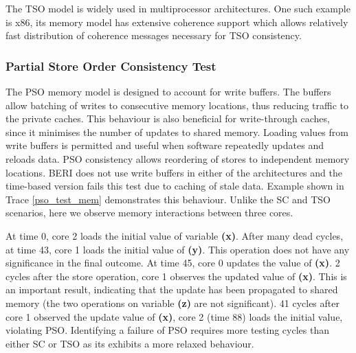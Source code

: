 			\begin{comment}
			setAddrMap(<10,  8,  6,  0>)
			chooseVars(<V 0x8 0xd 0xa 0xf  >)
			2062: core[0].op(LW,'h0)
			2066: core[2].op(SW,'h0)
			2074: core[2].op(SW,'h2)
			2077: core[0].op(LW,'h2)
			2110: core[0].op(LW,'h0)
			0: v8 == 0
			2: v8 := 10
			2: v10 := 18
			0: v10 == 18
			0: v8 == 0
			Failed!
			\end{comment}

		The TSO model is widely used in multiprocessor architectures. One such example is x86, its memory model has extensive coherence support which allows relatively fast distribution of coherence messages necessary for TSO consistency.

		\subsubsection{Partial Store Order Consistency Test}
			The PSO memory model is designed to account for write buffers. The buffers allow batching of writes to consecutive memory locations, thus reducing traffic to the private caches. This behaviour is also beneficial for write-through caches, since it minimises the number of updates to shared memory. Loading values from write buffers is permitted and useful when software repeatedly updates and reloads data. PSO consistency allows reordering of stores to independent memory locations. BERI does not use write buffers in either of the architectures and the time-based version fails this test due to caching of stale data. Example shown in Trace \ref{pso_test_mem} demonstrates this behaviour. Unlike the SC and TSO scenarios, here we observe memory interactions between three cores.
			
			At time 0, core 2 loads the initial value of variable \textbf{(x)}. After many dead cycles, at time 43, core 1 loads the initial value of \textbf{(y)}. This operation does not have any significance in the final outcome. At time 45, core 0 updates the value of \textbf{(x)}. 2 cycles after the store operation, core 1 observes the updated value of \textbf{(x)}. This is an important result, indicating that the update has been propagated to shared memory (the two operations on variable \textbf{(z)} are not significant). 41 cycles after core 1 observed the update value of \textbf{(x)}, core 2 (time 88) loads the initial value, violating PSO. Identifying a failure of PSO requires more testing cycles than either SC or TSO as its exhibits a more relaxed behaviour.

